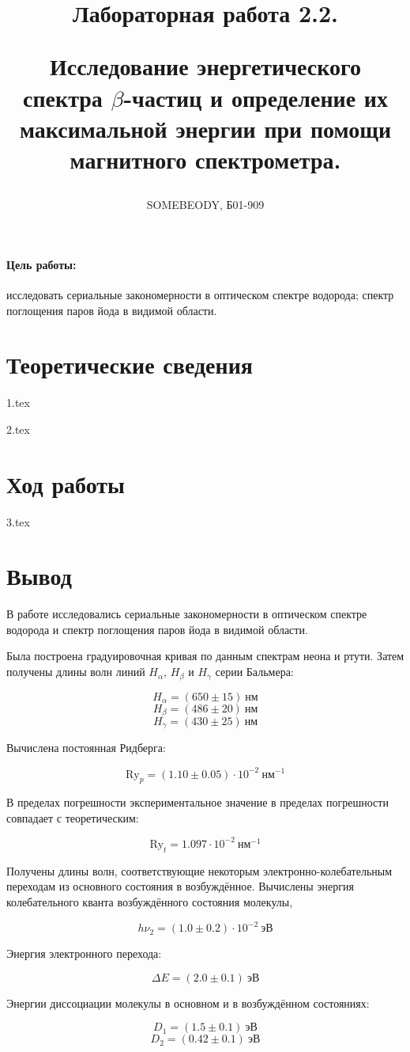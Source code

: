 \documentclass[a5paper, 10pt, twoside]{article} %
\title
{\hfill \break  \hfill \break
\hfill \break  \hfill \break
Лабораторная работа 2.2.

Исследование энергетического спектра $\beta$-частиц и определение их
максимальной энергии при помощи магнитного спектрометра.}
\author{SOMEBEODY, Б01-909}
\begin{document}
\maketitle



\thispagestyle{empty} %

\newpage

\tableofcontents %
\thispagestyle{plain}
\newpage


\paragraph{Цель работы:}
исследовать сериальные закономерности в оптическом спектре водорода; спектр
поглощения паров йода в видимой области.

\section{Теоретические сведения}
{1.tex}

{2.tex}

\newpage
\section{Ход работы}
{3.tex}

\newpage
\section{Вывод}

В работе исследовались сериальные закономерности в оптическом спектре водорода и
спектр поглощения паров йода в видимой области.

Была построена градуировочная кривая по данным спектрам неона и ртути. Затем
получены длины волн линий $H_{\alpha}$, $H_{\beta}$ и $H_{\gamma}$ серии
Бальмера:

\[  H_{\alpha} = (650\pm 15)\ \text{нм} \]
\[  H_{\beta} = (486\pm 20)\ \text{нм} \]
\[  H_{\gamma} = (430\pm  25)\  \text{нм} \]


Вычислена постоянная Ридберга:

\[ \text{Ry}_p=(1.10\pm 0.05)\cdot 10^{-2} ~\text{нм}^{-1} \]

В пределах погрешности экспериментальное значение в пределах погрешности
совпадает с теоретическим:

\[ \text{Ry}_t=1.097\cdot 10^{-2} \ \text{нм}^{-1} \]


Получены длины волн, соответствующие некоторым электронно-колебательным
переходам из основного состояния в возбуждённое. Вычислены энергия
колебательного кванта возбуждённого состояния молекулы,

\[	h\nu_2=(1.0\pm 0.2)\cdot 10^{-2} \ \text{эВ} \]

Энергия электронного перехода:

\[ \Delta E=(2.0\pm 0.1) \ \text{эВ} \]

Энергии диссоциации молекулы в основном и в возбуждённом состояниях:

\[ D_1=(1.5\pm 0.1)\  \text{эВ} \]
\[ D_2=(0.42\pm 0.1) \ \text{эВ} \]
\end{document}
